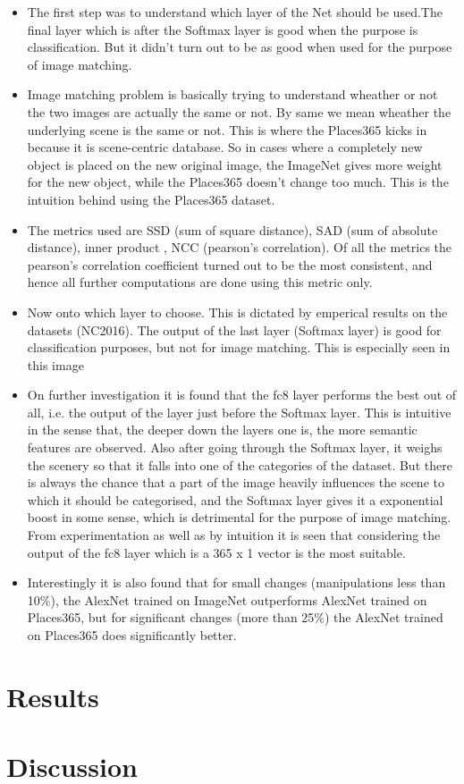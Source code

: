 \documentclass{article}
\begin{document}
\begin{itemize}
\item The first step was to understand which layer of the Net should be used.The final layer which is after the Softmax layer is good when the purpose is classification. But it didn't turn out to be as good when used for the purpose of image matching.
\item Image matching problem is basically trying to understand wheather or not the two images are actually the same or not. By same we mean wheather the underlying scene is the same or not. This is where the Places365 kicks in because it is scene-centric database. So in cases where a completely new object is placed on the new original image, the ImageNet gives more weight for the new object, while the Places365 doesn't change too much. This is the intuition behind using the Places365 dataset.
\item The metrics used are SSD (sum of square distance), SAD (sum of absolute distance), inner product , NCC (pearson's correlation). Of all the metrics the pearson's correlation coefficient turned out to be the most consistent, and hence all further computations are done using this metric only.
\item Now onto which layer to choose. This is dictated by emperical results on the datasets (NC2016). The output of the last layer (Softmax layer) is good for classification purposes, but not for image matching. This is especially seen in this image %
\item On further investigation it is found that the fc8 layer performs the best out of all, i.e. the output of the layer just before the Softmax layer. This is intuitive in the sense that, the deeper down the layers one is, the more semantic features are observed. Also after going through the Softmax layer, it weighs the scenery so that it falls into one of the categories of the dataset. But there is always the chance that a part of the image heavily influences the scene to which it should be categorised, and the Softmax layer gives it a exponential boost in some sense, which is detrimental for the purpose of image matching. From experimentation as well as by intuition it is seen that considering the output of the fc8 layer which is a 365 x 1 vector is the most suitable.
\item Interestingly it is also found that for small changes (manipulations less than 10\%), the AlexNet trained on ImageNet outperforms AlexNet trained on Places365, but for significant changes (more than 25\%) the AlexNet trained on Places365 does significantly better.
\end{itemize}






\section{Results}
\section{Discussion}
\end{document}
